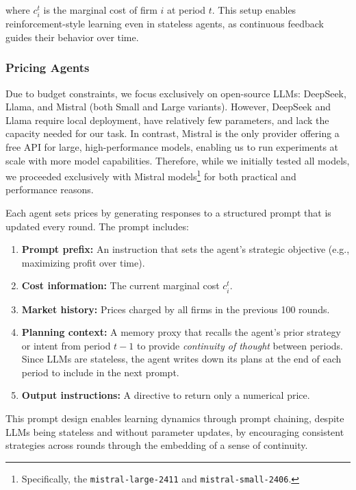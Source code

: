 where $c_i^t$ is the marginal cost of firm $i$ at period $t$. This setup enables reinforcement-style learning even in stateless agents, as continuous feedback guides their behavior over time.

\subsubsection*{Pricing Agents}

Due to budget constraints, we focus exclusively on open-source LLMs: DeepSeek, Llama, and Mistral (both Small and Large variants). However, DeepSeek and Llama require local deployment, have relatively few parameters, and lack the capacity needed for our task. In contrast, Mistral is the only provider offering a free API for large, high-performance models, enabling us to run experiments at scale with more model capabilities. Therefore, while we initially tested all models, we proceeded exclusively with Mistral models\footnote{Specifically, the \texttt{mistral-large-2411} and \texttt{mistral-small-2406}.} for both practical and performance reasons.

Each agent sets prices by generating responses to a structured prompt that is updated every round. The prompt includes:

\begin{enumerate}
    \item \textbf{Prompt prefix:} An instruction that sets the agent's strategic objective (e.g., maximizing profit over time).
    \item \textbf{Cost information:} The current marginal cost $c_i^t$.
    \item \textbf{Market history:} Prices charged by all firms in the previous 100 rounds.
    \item \textbf{Planning context:} A memory proxy that recalls the agent's prior strategy or intent from period $t-1$ to provide \emph{continuity of thought} between periods. Since LLMs are stateless, the agent writes down its plans at the end of each period to include in the next prompt.
    \item \textbf{Output instructions:} A directive to return only a numerical price.
\end{enumerate}

This prompt design enables learning dynamics through prompt chaining, despite LLMs being stateless and without parameter updates, by encouraging consistent strategies across rounds through the embedding of a sense of continuity.

